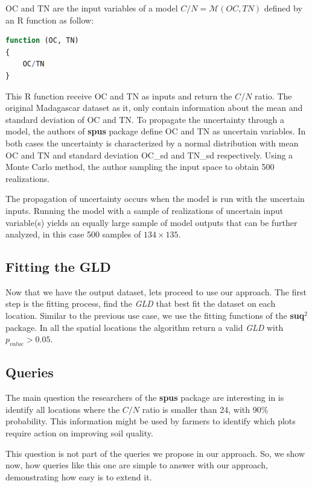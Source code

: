 OC and TN are the input variables of a model $C/N = \mathcal{M}(OC, TN)$ defined by an R function as follow:

\begin{lstlisting}[language=R]
function (OC, TN) 
{
    OC/TN
}
\end{lstlisting}

This R function receive OC and TN as inputs and return the $C/N$ ratio. The original Madagascar dataset as it, only contain information about the mean and standard deviation of OC and TN. To propagate the uncertainty through a model, the authors of \textbf{spus} package define OC and TN as uncertain variables. In both cases the uncertainty is characterized by a normal distribution with mean OC and TN and standard deviation OC\_sd and TN\_sd respectively. Using a Monte Carlo method, the author sampling the input space to obtain 500 realizations. 

The propagation of uncertainty occurs when the model is run with the uncertain inputs. Running the model with a sample of realizations of uncertain input variable(s) yields an equally large sample of model outputs that can be further analyzed, in this case 500 samples of $134 \times 135$.

\subsection{Fitting the GLD}
Now that we have the output dataset, lets proceed to use our approach. The first step is the fitting process, find the \textit{GLD} that best fit the dataset on each location. Similar to the previous use case, we use the fitting functions of the \textbf{suq$^2$} package. In all the spatial locations the algorithm return a valid \textit{GLD} with $p_{value} > 0.05$. 

\subsection{Queries}\label{sec:use_case_II_queries}
The main question the researchers of the \textbf{spus} package are interesting in is identify all locations where the $C/N$ ratio is smaller than 24, with 90\% probability. This information might be used by farmers to identify which plots require action on improving soil quality.

This question is not part of the queries we propose in our approach. So, we show now, how queries like this one are simple to answer with our approach, demonstrating how easy is to extend it.

